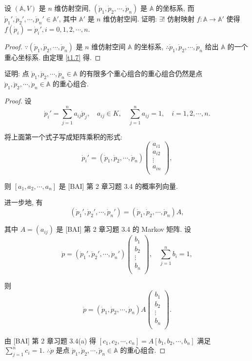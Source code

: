 \documentclass{ctexart}
\begin{document}
\begin{exercise}[1.3]
    设 $(\mathbb{A},V)$ 是 $n$ 维仿射空间, $(\dot{p}_1,\dot{p}_2,\cdots,\dot{p}_n)$ 是 $\mathbb{A}$ 的坐标系, 而 $\dot{p}_1',\dot{p}_2',\cdots,\dot{p}_n'\in\mathbb{A}'$, 其中 $\mathbb{A}'$ 是 $n$ 维仿射空间. 证明: $\exists!$ 仿射映射 $f:\mathbb{A}\to\mathbb{A}'$ 使得 $f(\dot{p}_i)=\dot{p}_i',i=0,1,2,\cdots,n$.
\end{exercise}
\begin{proof}
    $\because(\dot{p}_1,\dot{p}_2,\cdots,\dot{p}_n)$ 是 $n$ 维仿射空间 $\mathbb{A}$ 的坐标系, $\therefore\dot{p}_1,\dot{p}_2,\cdots,\dot{p}_n$ 给出 $\mathbb{A}$ 的一个重心坐标系. 由定理 \ref{t1.7} 得.
\end{proof}
\begin{exercise}[1.4]
    证明: 点 $\dot{p}_1,\dot{p}_2,\cdots,\dot{p}_n\in\mathbb{A}$ 的有限多个重心组合的重心组合仍然是点 $\dot{p}_1,\dot{p}_2,\cdots,\dot{p}_n\in\mathbb{A}$ 的重心组合.
\end{exercise}
\begin{proof}
    设
    \[\dot{p}_i'=\sum\limits_{j=1}^na_{ij}\dot{p}_j,\quad a_{ij}\in K,\quad\sum\limits_{j=1}^na_{ij}=1,\quad i=1,2,\cdots,n.\]

    将上面第一个式子写成矩阵乘积的形式:
    \[\dot{p}_i'=(\dot{p}_1,\dot{p}_2,\cdots,\dot{p}_n)\begin{pmatrix}
        a_{i1} \\
        a_{i2} \\
        \vdots \\
        a_{in} \\
    \end{pmatrix},\]

    则 $[a_1,a_2,\cdots,a_n]$ 是 [BAI] 第 2 章习题 3.4 的概率列向量.

    进一步地, 有
    \[(\dot{p}_1',\dot{p}_2',\cdots,\dot{p}_n')=(\dot{p}_1,\dot{p}_2,\cdots,\dot{p}_n)A,\]

    其中 $A=(a_{ij})$ 是 [BAI] 第 2 章习题 3.4 的 Markov 矩阵. 设
    \[\dot{p}=(\dot{p}_1',\dot{p}_2',\cdots,\dot{p}_n')\begin{pmatrix}
        b_1 \\
        b_2 \\
        \vdots \\
        b_n \\
    \end{pmatrix},\quad\sum\limits_{j=1}^nb_i=1,\]

    则
    \[\dot{p}=(\dot{p}_1,\dot{p}_2,\cdots,\dot{p}_n)A\begin{pmatrix}
        b_1 \\
        b_2 \\
        \vdots \\
        b_n \\
    \end{pmatrix}.\]

    由 [BAI] 第 2 章习题 3.4(a) 得 $[c_1,c_2,\cdots,c_n]=A[b_1,b_2,\cdots,b_n]$ 满足 $\sum\limits_{j=1}^nc_i=1$. $\therefore\dot{p}$ 是点 $\dot{p}_1,\dot{p}_2,\cdots,\dot{p}_n\in\mathbb{A}$ 的重心组合.
\end{proof}
\end{document}
